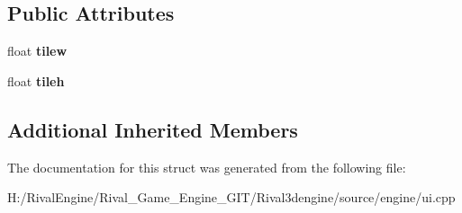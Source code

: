 \subsection*{Public Attributes}
\begin{DoxyCompactItemize}
\item 
\mbox{\label{struct_u_i_1_1_tiled_image_a662cd45a5bfe284f215002c6fe632c5c}} 
float {\bfseries tilew}
\item 
\mbox{\label{struct_u_i_1_1_tiled_image_acda34bd874ad8fdcd291bce7c179057c}} 
float {\bfseries tileh}
\end{DoxyCompactItemize}
\subsection*{Additional Inherited Members}


The documentation for this struct was generated from the following file\+:\begin{DoxyCompactItemize}
\item 
H\+:/\+Rival\+Engine/\+Rival\+\_\+\+Game\+\_\+\+Engine\+\_\+\+G\+I\+T/\+Rival3dengine/source/engine/ui.\+cpp\end{DoxyCompactItemize}
